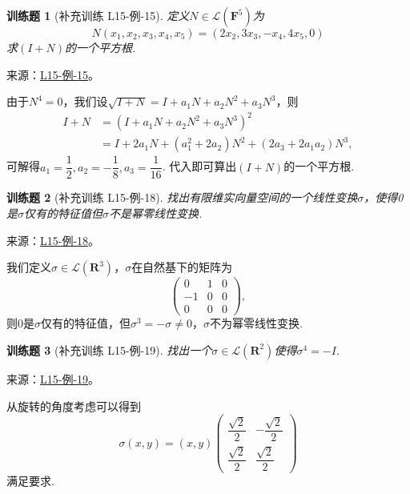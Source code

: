 \documentclass[12pt,fontset=fandol]{ctexart}
\newtheorem{exercise}{训练题}[section]
\begin{document}
\begin{exercise}[补充训练 L15-例-15]\label{prob:L15-例-15}
定义$N\in \mathcal{L}(\mathbf{F}^5)$为
    \[N(x_1,x_2,x_3,x_4,x_5)=(2x_2,3x_3,-x_4,4x_5,0)\]
    求$(I+N)$的一个平方根.
\end{exercise}
\noindent 来源：\href{https://github.com/yhwu-is/Linear-Algebra-Left-Undone/blob/new/%E8%AE%B2%E4%B9%89/%E4%B8%93%E9%A2%98/15%20%E7%9B%B8%E4%BC%BC%E6%A0%87%E5%87%86%E5%BD%A2%EF%BC%9A%E5%A4%8D%E6%95%B0%E5%9F%9F%E4%B8%8A%E7%9A%84%E5%B0%9D%E8%AF%95%E4%B8%8E%E7%90%86%E8%AE%BA.tex}{L15-例-15}。
\begin{solve}
由于$N^4=0$，我们设$\sqrt{I+N}=I+a_1N+a_2N^2+a_3N^3$，则
    \begin{align*}
        I+N&=(I+a_1N+a_2N^2+a_3N^3)^2 \\
        &=I+2a_1N+(a_1^2+2a_2)N^2+(2a_3+2a_1a_2)N^3,
    \end{align*}
    可解得$a_1=\dfrac{1}{2},a_2=-\dfrac{1}{8},a_3=\dfrac{1}{16}$. 代入即可算出$(I+N)$的一个平方根.
\end{solve}

\begin{exercise}[补充训练 L15-例-18]\label{prob:L15-例-18}
找出有限维实向量空间的一个线性变换$\sigma$，使得0是$\sigma$仅有的特征值但$\sigma$不是幂零线性变换.
\end{exercise}
\noindent 来源：\href{https://github.com/yhwu-is/Linear-Algebra-Left-Undone/blob/new/%E8%AE%B2%E4%B9%89/%E4%B8%93%E9%A2%98/15%20%E7%9B%B8%E4%BC%BC%E6%A0%87%E5%87%86%E5%BD%A2%EF%BC%9A%E5%A4%8D%E6%95%B0%E5%9F%9F%E4%B8%8A%E7%9A%84%E5%B0%9D%E8%AF%95%E4%B8%8E%E7%90%86%E8%AE%BA.tex}{L15-例-18}。
\begin{solve}
我们定义$\sigma\in\mathcal{L}({\mathbf{R}^3})$，$\sigma$在自然基下的矩阵为
            \[\begin{pmatrix}
                0 & 1 & 0 \\
                -1 & 0 & 0 \\
                0 & 0 & 0
            \end{pmatrix},\]
            则$0$是$\sigma$仅有的特征值，但$\sigma^3=-\sigma\neq 0$，$\sigma$不为幂零线性变换.
\end{solve}

\begin{exercise}[补充训练 L15-例-19]\label{prob:L15-例-19}
找出一个$\sigma\in \mathcal{L}(\mathbf{R}^2)$使得$\sigma^4=-I$.
\end{exercise}
\noindent 来源：\href{https://github.com/yhwu-is/Linear-Algebra-Left-Undone/blob/new/%E8%AE%B2%E4%B9%89/%E4%B8%93%E9%A2%98/15%20%E7%9B%B8%E4%BC%BC%E6%A0%87%E5%87%86%E5%BD%A2%EF%BC%9A%E5%A4%8D%E6%95%B0%E5%9F%9F%E4%B8%8A%E7%9A%84%E5%B0%9D%E8%AF%95%E4%B8%8E%E7%90%86%E8%AE%BA.tex}{L15-例-19}。
\begin{solve}
从旋转的角度考虑可以得到
            \[
            \sigma(x,y)=(x,y)\begin{pmatrix}
                \dfrac{\sqrt{2}}{2} & -\dfrac{\sqrt{2}}{2} \\[1ex]
                \dfrac{\sqrt{2}}{2} & \dfrac{\sqrt{2}}{2}
            \end{pmatrix}
            \]
            满足要求.
\end{solve}
\end{document}
